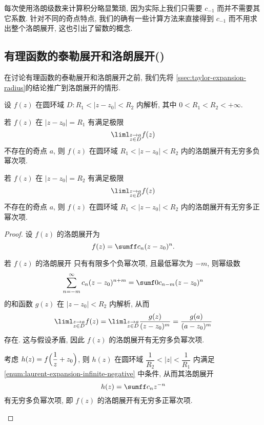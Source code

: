 每次使用洛朗级数来计算积分略显繁琐, 因为实际上我们只需要 $c_{-1}$ 而并不需要其它系数.
针对不同的奇点特点, 我们的确有一些计算方法来直接得到 $c_{-1}$ 而不用求出整个洛朗展开, 这也引出了留数的概念.


\subsection{有理函数的泰勒展开和洛朗展开(\optional)}
\label{ssec:rational-function-expansion}

在讨论有理函数的泰勒展开和洛朗展开之前, 我们先将 \ref{ssec:taylor-expansion-radius}的结论推广到洛朗展开的情形.

\begin{theorem}
  设 $f(z)$ 在圆环域 $D:R_1<|z-z_0|<R_2$ 内解析, 其中 $0<R_1<R_2<+\infty$.
  \begin{enuma}
    \item 若 $f(z)$ 在 $|z-z_0|=R_1$ 有满足极限
    \[
      \liml_{\substack{z\ra a\\ z\in D}} f(z)
    \]
    不存在的奇点 $a$, 则 $f(z)$ 在圆环域 $R_1<|z-z_0|<R_2$ 内的洛朗展开有无穷多负幂次项.
    \label{enum:laurent-expansion-infinite-negative}
    \item 若 $f(z)$ 在 $|z-z_0|=R_2$ 有满足极限
    \[
      \liml_{\substack{z\ra a\\z\in D}} f(z)
    \]
    不存在的奇点 $a$, 则 $f(z)$ 在圆环域 $R_1<|z-z_0|<R_2$ 内的洛朗展开有无穷多正幂次项.
  \end{enuma}
\end{theorem}

\begin{proof}
  设 $f(z)$ 的洛朗展开为
  \[
    f(z)=\sumff c_n(z-z_0)^n.
  \]
  \begin{enuma}
    \item 若 $f(z)$ 的洛朗展开
    只有有限多个负幂次项, 且最低幂次为 $-m$, 则幂级数
    \[
        \sum_{n=-m}^\infty c_n(z-z_0)^{n+m}
      =\sumf0 c_{n-m}(z-z_0)^n
    \]
    的和函数 $g(z)$ 在 $|z-z_0|<R_2$ 内解析, 从而
    \[
      \liml_{\substack{z\ra a\\z\in D}} f(z)
      =\liml_{\substack{z\ra a\\z\in D}} \frac{g(z)}{(z-z_0)^m}
      =\frac{g(a)}{(a-z_0)^m}
    \]
    存在.
    这与假设矛盾, 因此 $f(z)$ 的洛朗展开有无穷多负幂次项.
    \item 考虑 $h(z)=f\Bigl(\dfrac1z+z_0\Bigr)$, 则 $h(z)$ 在圆环域 $\dfrac 1{R_2}<|z|<\dfrac 1{R_1}$ 内满足 \ref{enum:laurent-expansion-infinite-negative} 中条件, 从而其洛朗展开
    \[
      h(z)=\sumff c_nz^{-n}
    \]
    有无穷多负幂次项, 即 $f(z)$ 的洛朗展开有无穷多正幂次项.
    \qedhere
  \end{enuma}
\end{proof}

